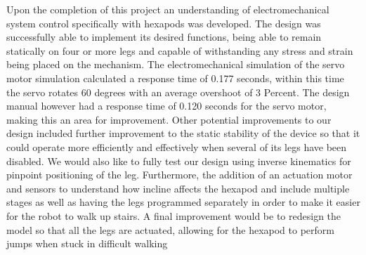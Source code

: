 Upon the completion of this project an understanding of electromechanical system control specifically with hexapods was developed. The design was successfully able to implement its desired functions, being able to remain statically on four or more legs and capable of withstanding any stress and strain being placed on the mechanism. The electromechanical simulation of the servo motor simulation calculated a response time of 0.177 seconds, within this time the servo rotates 60 degrees with an average overshoot of 3 Percent. The design manual however had a response time of 0.120 seconds for the servo motor, making this an area for improvement. Other potential improvements to our design included further improvement to the static stability of the device so that it could operate more efficiently and effectively when several of its legs have been disabled. We would also like to fully test our design using inverse kinematics for  pinpoint positioning of the leg. Furthermore, the addition of an  actuation motor and sensors to understand how incline affects the hexapod and include multiple stages as well as having the legs programmed separately in order to make it easier for the robot to walk up stairs. A final improvement would be to redesign the model so that all the legs are actuated, allowing for the hexapod to perform jumps when stuck in difficult walking









